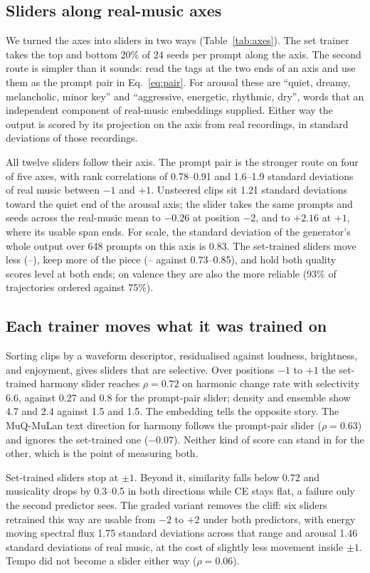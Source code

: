 \subsection{Sliders along real-music axes}

We turned the axes into sliders in two ways (Table~\ref{tab:axes}). The set trainer takes the top and bottom 20\% of 24 seeds per prompt along the axis. The second route is simpler than it sounds: read the tags at the two ends of an axis and use them as the prompt pair in Eq.~\eqref{eq:pair}. For arousal these are ``quiet, dreamy, melancholic, minor key'' and ``aggressive, energetic, rhythmic, dry'', words that an independent component of real-music embeddings supplied. Either way the output is scored by its projection on the axis from real recordings, in standard deviations of those recordings.

All twelve sliders follow their axis. The prompt pair is the stronger route on four of five axes, with rank correlations of 0.78--0.91 and 1.6--1.9 standard deviations of real music between $-1$ and $+1$. Unsteered clips sit 1.21 standard deviations toward the quiet end of the arousal axis; the slider takes the same prompts and seeds across the real-music mean to $-0.26$ at position $-2$, and to $+2.16$ at $+1$, where its usable span ends. For scale, the standard deviation of the generator's whole output over 648 prompts on this axis is 0.83. The set-trained sliders move less (\axRealLo{}--\axRealHi{}), keep more of the piece (\axKeepLo{}--\axKeepHi{} against 0.73--0.85), and hold both quality scores level at both ends; on valence they are also the more reliable (93\% of trajectories ordered against 75\%).



\subsection{Each trainer moves what it was trained on}

Sorting clips by a waveform descriptor, residualised against loudness, brightness, and enjoyment, gives sliders that are selective. Over positions $-1$ to $+1$ the set-trained harmony slider reaches $\rho=0.72$ on harmonic change rate with selectivity 6.6, against 0.27 and 0.8 for the prompt-pair slider; density and ensemble show 4.7 and 2.4 against 1.5 and 1.5. The embedding tells the opposite story. The MuQ-MuLan text direction for harmony follows the prompt-pair slider ($\rho=0.63$) and ignores the set-trained one ($-0.07$). Neither kind of score can stand in for the other, which is the point of measuring both.

Set-trained sliders stop at $\pm1$. Beyond it, similarity falls below 0.72 and musicality drops by 0.3--0.5 in both directions while CE stays flat, a failure only the second predictor sees. The graded variant removes the cliff: six sliders retrained this way are usable from $-2$ to $+2$ under both predictors, with energy moving spectral flux 1.75 standard deviations across that range and arousal 1.46 standard deviations of real music, at the cost of slightly less movement inside $\pm1$. Tempo did not become a slider either way ($\rho=0.06$).
